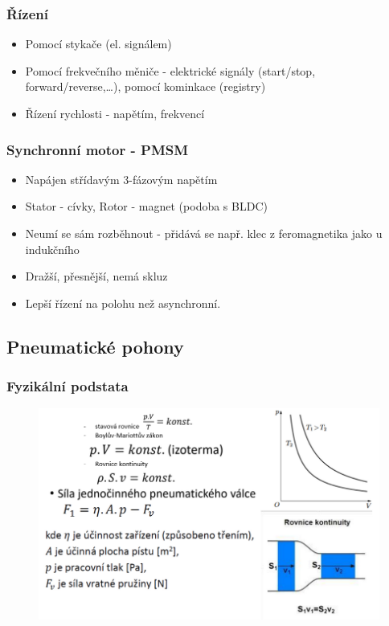 \subsubsection*{Řízení}
\begin{itemize}
  \item Pomocí stykače (el. signálem)
  \item Pomocí frekvečního měniče - elektrické signály (start/stop, forward/reverse,\dots), pomocí kominkace (registry)
  \item Řízení rychlosti - napětím, frekvencí
\end{itemize}

\subsubsection*{Synchronní motor - PMSM}
\begin{itemize}
  \item Napájen střídavým 3-fázovým napětím
  \item Stator - cívky, Rotor - magnet (podoba s BLDC)
  \item Neumí se sám rozběhnout - přidává se např. klec z feromagnetika jako u indukčního
  \item Dražší, přesnější, nemá skluz
  \item Lepší řízení na polohu než asynchronní.
\end{itemize}

\subsection{Pneumatické pohony}
\subsubsection*{Fyzikální podstata}

\begin{figure}[h]
  \begin{center}
    \includegraphics[scale = 0.7]{img/Picture12.png}
  \end{center}
\end{figure}

